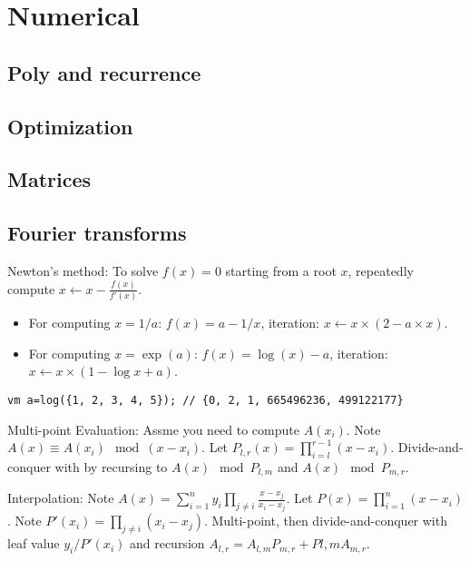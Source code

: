 \chapter{Numerical}

\section{Poly and recurrence}

\section{Optimization}

\section{Matrices}

\section{Fourier transforms}
	Newton's method: To solve $f(x) = 0$ starting from a root $x$, repeatedly compute
	$x \leftarrow x - \frac{f(x)}{f'(x)}$.
	\begin{itemize}
	  \item For computing $x=1/a$: $f(x) = a-1/x$, iteration: $x \leftarrow x\times (2-a\times x)$.
	  \item For computing $x=\exp(a)$: $f(x) = \log(x)-a$, iteration: $x \leftarrow x\times (1-\log x+a)$.
	\end{itemize}
\begin{lstlisting}
vm a=log({1, 2, 3, 4, 5}); // {0, 2, 1, 665496236, 499122177}
\end{lstlisting}
  Multi-point Evaluation: Assme you need to compute $A(x_i)$. Note $A(x) \equiv A(x_i) \mod (x - x_i)$. Let $P_{l,r}(x) = \prod_{i=l}^{r-1} (x - x_i)$. Divide-and-conquer with by recursing to $A(x) \mod P_{l,m}$ and $A(x) \mod P_{m,r}$.

  Interpolation: Note $A(x) = \sum_{i=1}^n y_i \prod_{j \neq i} \frac{x - x_j}{x_i - x_j}$. Let $P(x) = \prod_{i=1}^n (x - x_i)$. Note $P'(x_i) = \prod_{j \neq i} (x_i - x_j)$. Multi-point, then divide-and-conquer with leaf value $y_i / P'(x_i)$ and recursion $A_{l,r} = A_{l,m} P_{m,r} + P{l,m} A_{m,r}$.
